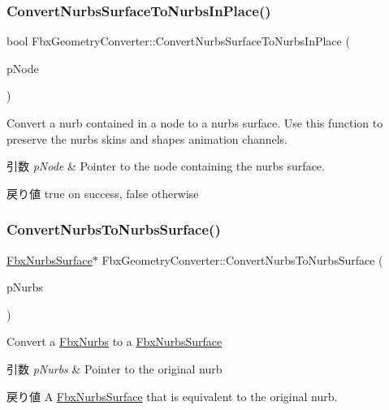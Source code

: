 \subsubsection{\texorpdfstring{Convert\+Nurbs\+Surface\+To\+Nurbs\+In\+Place()}{ConvertNurbsSurfaceToNurbsInPlace()}}
{\footnotesize\ttfamily bool Fbx\+Geometry\+Converter\+::\+Convert\+Nurbs\+Surface\+To\+Nurbs\+In\+Place (\begin{DoxyParamCaption}\item[{\hyperlink{class_fbx_node}{Fbx\+Node} $\ast$}]{p\+Node }\end{DoxyParamCaption})}

Convert a nurb contained in a node to a nurbs surface. Use this function to preserve the nurb\textquotesingle{}s skins and shapes animation channels. 
\begin{DoxyParams}{引数}
{\em p\+Node} & Pointer to the node containing the nurbs surface. \\
\hline
\end{DoxyParams}
\begin{DoxyReturn}{戻り値}
{\ttfamily true} on success, {\ttfamily false} otherwise 
\end{DoxyReturn}
\mbox{\label{class_fbx_geometry_converter_a33fe5cce26020e2687dcd1b1e05109a4}} 
\subsubsection{\texorpdfstring{Convert\+Nurbs\+To\+Nurbs\+Surface()}{ConvertNurbsToNurbsSurface()}}
{\footnotesize\ttfamily \hyperlink{class_fbx_nurbs_surface}{Fbx\+Nurbs\+Surface}$\ast$ Fbx\+Geometry\+Converter\+::\+Convert\+Nurbs\+To\+Nurbs\+Surface (\begin{DoxyParamCaption}\item[{\hyperlink{class_fbx_nurbs}{Fbx\+Nurbs} $\ast$}]{p\+Nurbs }\end{DoxyParamCaption})}

Convert a \hyperlink{class_fbx_nurbs}{Fbx\+Nurbs} to a \hyperlink{class_fbx_nurbs_surface}{Fbx\+Nurbs\+Surface} 
\begin{DoxyParams}{引数}
{\em p\+Nurbs} & Pointer to the original nurb \\
\hline
\end{DoxyParams}
\begin{DoxyReturn}{戻り値}
A \hyperlink{class_fbx_nurbs_surface}{Fbx\+Nurbs\+Surface} that is equivalent to the original nurb. 
\end{DoxyReturn}
\mbox{\label{class_fbx_geometry_converter_ae8662fd4c468b6e18b276f3ef353fe2f}} 

